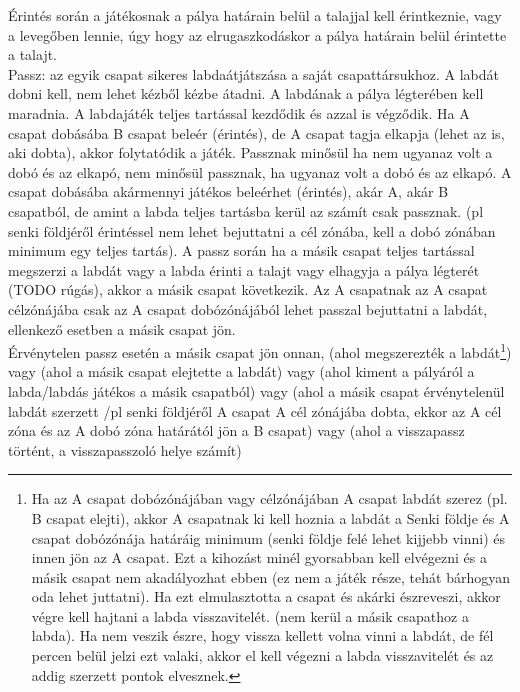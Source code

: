 \documentclass[a4paper, 12pt, twoside, openright]{article}
\begin{document}
\begin{itemize}
Érintés során a játékosnak a pálya határain belül a talajjal kell érintkeznie, vagy a levegőben lennie, úgy hogy az elrugaszkodáskor a pálya határain belül érintette a talajt.\\
Passz: az egyik csapat sikeres labdaátjátszása a saját csapattársukhoz. A labdát dobni kell, nem lehet kézből kézbe átadni. A labdának a pálya légterében kell maradnia. A labdajáték teljes tartással kezdődik és azzal is végződik. Ha A csapat dobásába B csapat beleér (érintés), de A csapat tagja elkapja (lehet az is, aki dobta), akkor folytatódik a játék. Passznak minősül ha nem ugyanaz volt a dobó és az elkapó, nem minősül passznak, ha ugyanaz volt a dobó és az elkapó. A csapat dobásába akármennyi játékos beleérhet (érintés), akár A, akár B csapatból, de amint a labda teljes tartásba kerül az számít csak passznak. (pl senki földjéről érintéssel nem lehet bejuttatni a cél zónába, kell a dobó zónában minimum egy teljes tartás). A passz során ha a másik csapat teljes tartással megszerzi a labdát vagy a labda érinti a talajt vagy elhagyja a pálya légterét (TODO rúgás), akkor a másik csapat következik. Az A csapatnak az A csapat célzónájába csak az A csapat dobózónájából lehet passzal bejuttatni a labdát, ellenkező esetben a másik csapat jön.\\
Érvénytelen passz esetén a másik csapat jön onnan, (ahol megszerezték a labdát\footnote{Ha az A csapat dobózónájában vagy célzónájában A csapat labdát szerez (pl. B csapat elejti), akkor A csapatnak ki kell hoznia a labdát a Senki földje és A csapat dobózónája határáig minimum (senki földje felé lehet kijjebb vinni) és innen jön az A csapat. Ezt a kihozást minél gyorsabban kell elvégezni és a másik csapat nem akadályozhat ebben (ez nem a játék része, tehát bárhogyan oda lehet juttatni). Ha ezt elmulasztotta a csapat és akárki észreveszi, akkor végre kell hajtani a labda visszavitelét. (nem kerül a másik csapathoz a labda). Ha nem veszik észre, hogy vissza kellett volna vinni a labdát, de fél percen belül jelzi ezt valaki, akkor el kell végezni a labda visszavitelét és az addig szerzett pontok elvesznek.}) vagy (ahol a másik csapat elejtette a labdát\footnotemark[\value{footnote}]) vagy (ahol kiment a pályáról a labda/labdás játékos a másik csapatból\footnotemark[\value{footnote}]) vagy (ahol a másik csapat érvénytelenül labdát szerzett /pl senki földjéről A csapat A cél zónájába dobta, ekkor az A cél zóna és az A dobó zóna határától jön a B csapat) vagy (ahol a visszapassz történt, a visszapasszoló helye számít\footnotemark[\value{footnote}]) \\

\end{itemize}
\end{document}
